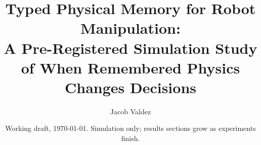 \documentclass[11pt,a4paper]{article}
\title{Typed Physical Memory for Robot Manipulation:\\
A Pre-Registered Simulation Study of When Remembered Physics Changes Decisions}
\author{Jacob Valdez}
\date{Working draft, \today. Simulation only; results sections grow as experiments finish.}
\begin{document}
\maketitle

\begin{abstract}

\end{abstract}










\FloatBarrier


\end{document}
